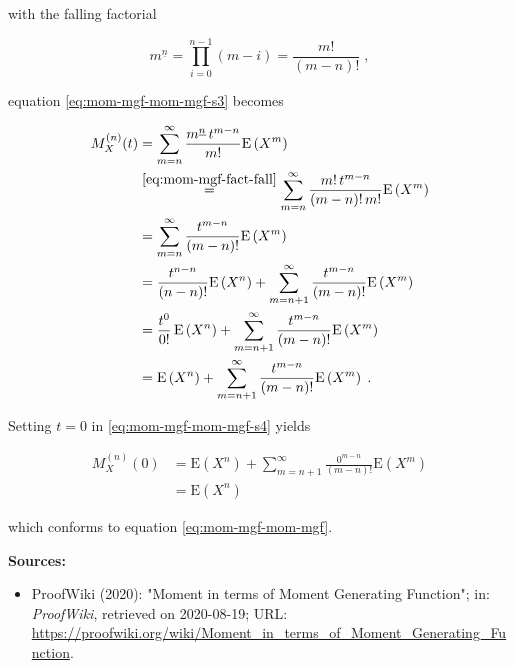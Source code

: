\documentclass[a4paper,12pt,twoside]{book}
\begin{document}
with the falling factorial

\begin{equation} \label{eq:mom-mgf-fact-fall}
m^{\underline{n}} = \prod_{i=0}^{n-1} (m-i) = \frac{m!}{(m-n)!} \; ,
\end{equation}

equation \eqref{eq:mom-mgf-mom-mgf-s3} becomes

\begin{equation} \label{eq:mom-mgf-mom-mgf-s4}
\begin{split}
M_X^{(n)}(t) &= \sum_{m=n}^\infty \frac{m^{\underline{n}} \, t^{m-n}}{m!} \mathrm{E}\left( X^m \right) \\
&\overset{\eqref{eq:mom-mgf-fact-fall}}{=} \sum_{m=n}^\infty \frac{m! \, t^{m-n}}{(m-n)! \, m!} \mathrm{E}\left( X^m \right) \\
&= \sum_{m=n}^\infty \frac{t^{m-n}}{(m-n)!} \mathrm{E}\left( X^m \right) \\
&= \frac{t^{n-n}}{(n-n)!} \mathrm{E}\left( X^n \right) + \sum_{m=n+1}^\infty \frac{t^{m-n}}{(m-n)!} \mathrm{E}\left( X^m \right) \\
&= \frac{t^0}{0!} \, \mathrm{E}\left( X^n \right) + \sum_{m=n+1}^\infty \frac{t^{m-n}}{(m-n)!} \mathrm{E}\left( X^m \right) \\
&= \mathrm{E}\left( X^n \right) + \sum_{m=n+1}^\infty \frac{t^{m-n}}{(m-n)!} \mathrm{E}\left( X^m \right) \; .
\end{split}
\end{equation}

Setting $t = 0$ in \eqref{eq:mom-mgf-mom-mgf-s4} yields

\begin{equation} \label{eq:mom-mgf-mom-mgf-s5}
\begin{split}
M_X^{(n)}(0) &= \mathrm{E}\left( X^n \right) + \sum_{m=n+1}^\infty \frac{0^{m-n}}{(m-n)!} \mathrm{E}\left( X^m \right) \\
&= \mathrm{E}\left( X^n \right)
\end{split}
\end{equation}

which conforms to equation \eqref{eq:mom-mgf-mom-mgf}.



\vspace{1em}
\textbf{Sources:}
\begin{itemize}
\item ProofWiki (2020): "Moment in terms of Moment Generating Function"; in: \textit{ProofWiki}, retrieved on 2020-08-19; URL: \url{https://proofwiki.org/wiki/Moment_in_terms_of_Moment_Generating_Function}.
\end{itemize}
\end{document}
